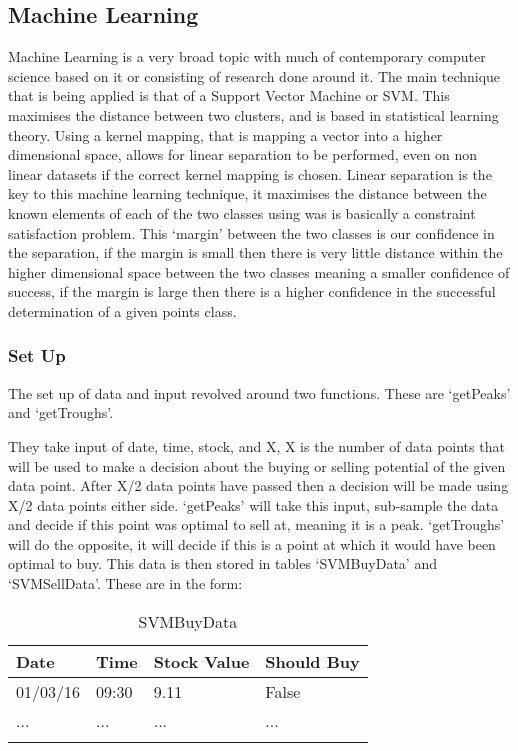 \documentclass[12pt,a4paper]{article}
\begin{document}
\iffalse
#################################################################################
\fi

\subsection*{Machine Learning}

Machine Learning is a very broad topic with much of contemporary computer science based on it or consisting of research done around it. The main technique that is being applied is that of a Support Vector Machine or SVM. This maximises the distance between two clusters, and is based in statistical learning theory. Using a kernel mapping, that is mapping a vector into a higher dimensional space, allows for linear separation to be performed, even on non linear datasets if the correct kernel mapping is chosen. Linear separation is the key to this machine learning technique, it maximises the distance between the known elements of each of the two classes using was is basically a constraint satisfaction problem. This `margin' between the two classes is our confidence in the separation, if the margin is small then there is very little distance within the higher dimensional space between the two classes meaning a smaller confidence of success, if the margin is large then there is a higher confidence in the successful determination of a given points class. 

\subsubsection*{Set Up}

The set up of data and input revolved around two functions. These are `getPeaks' and `getTroughs'.

They take input of date, time, stock, and X, X is the number of data points that will be used to make a decision about the buying or selling potential of the given data point. After X/2 data points have passed then a decision will be made using X/2 data points either side. `getPeaks' will take this input, sub-sample the data and decide if this point was optimal to sell at, meaning it is a peak. `getTroughs' will do the opposite, it will decide if this is a point at which it would have been optimal to buy. This data is then stored in tables `SVMBuyData' and `SVMSellData'. These are in the form:

\label{units}
\begin{longtable}{ |p{2.25cm}|p{2.25cm}|p{2.25cm}|p{2.25cm}| }\hline\hline
Date & Time & Stock Value & Should Buy \\ \hline
01/03/16 & 09:30 & 9.11 & False  \\ \hline
... & ... & ... & ...  \\ \hline
\caption{SVMBuyData}
\end{longtable}
\end{document}
